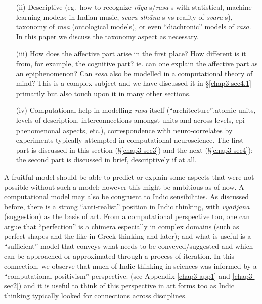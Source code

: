 \begin{itemize}
\item[(ii)] Descriptive (eg.~how to recognize \textsl{rāga}-s/\textsl{rasa}-s with statistical, machine learning models; in Indian music, \textsl{svara-sthāna}-s vs reality of \textsl{svara}-s), taxonomy of \textsl{rasa} (ontological models), or even “diachronic” models of \textsl{rasa}. In this paper we discuss the taxonomy aspect as necessary.

\item[(iii)] How does the affective part arise in the first place? How different is it from, for example, the cognitive part? ie. can one explain the affective part as an epiphenomenon? Can \textsl{rasa} also be modelled in a computational theory of mind? This is a complex subject and we have discussed it in \S\ref{chap3-sec4.1} primarily but also touch upon it in many other sections.

\item[(iv)] Computational help in modelling \textsl{rasa} itself (“architecture”,\break atomic units, levels of description, interconnections amongst units and across levels, epi-phenomenonal aspects, etc.), correspondence with neuro-correlates by experiments typically attempted in computational neuroscience. The first part is discussed in this section (\S\ref{chap3-sec3}) and the next (\S\ref{chap3-sec4}); the second part is discussed in brief, descriptively if at all.
\end{itemize}

A fruitful model should be able to predict or explain some aspects that were not possible without such a model; however this might be ambitious as of now. A computational model may also be congruent to Indic sensibilities. As discussed before, there is a strong “anti-realist” position in Indic thinking, with \textsl{vyañjanā} (suggestion) as the basis of art. From a computational perspective too, one can argue that “perfection” is a chimera especially in complex domains (such as perfect shapes and the like in Greek thinking and later); and what is useful is a “sufficient” model that conveys what needs to be conveyed/suggested and which can be approached or approximated through a process of iteration. In this connection, we observe that much of Indic thinking in sciences was informed by a ``computational positivism'' perspective. (see Appendix \ref{chap3-app1} and \ref{chap3-sec2}) and it is useful to think of this perspective in art forms too as Indic thinking typically looked for connections across disciplines.

